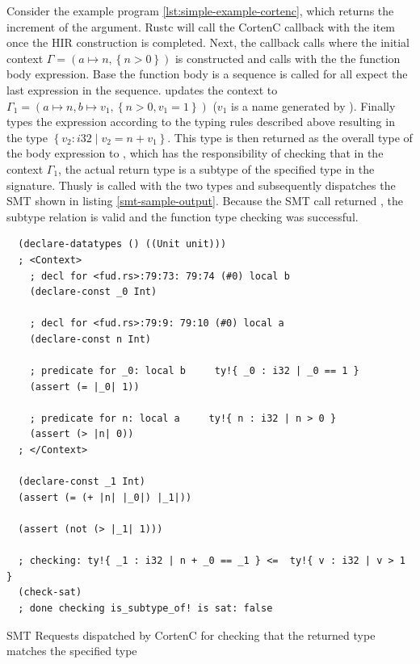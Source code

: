 \documentclass[twoside, english]{sdqthesis}
\theoremstyle{definition}
\begin{document}
Consider the example program \ref{lst:simple-example-cortenc}, which returns the increment of the argument.
Rustc will call the CortenC callback with the item  once the HIR construction is completed. Next, the callback calls  where the initial context $\Gamma = ( a \mapsto n, \left\{ n > 0\right\})$ is constructed and calls  with the the function body expression. Base the function body is a sequence  is called for all expect the last expression in the sequence.  updates the context to $\Gamma_1 = ( a \mapsto n, b \mapsto v_1, \left\{ n > 0, v_1 = 1\right\})$ ($v_1$ is a name generated by ). 
Finally  types the expression  according to the typing rules described above resulting in the type $\left\{ v_2 : i32 \mid v_2 = n + v_1\right\}$.
This type is then returned as the overall type of the body expression to , which has the responsibility of checking that in the context $\Gamma_1$, the actual return type is a subtype of the specified type in the signature. 
Thusly  is called with the two types and subsequently dispatches the SMT shown in listing \ref{smt-sample-output}. 
Because the SMT call returned , the subtype relation is valid and the function type checking was successful.


\begin{listing}[ht]
  \begin{verbatim}
  (declare-datatypes () ((Unit unit)))
  ; <Context>
    ; decl for <fud.rs>:79:73: 79:74 (#0) local b
    (declare-const _0 Int)
    
    ; decl for <fud.rs>:79:9: 79:10 (#0) local a
    (declare-const n Int)
    
    ; predicate for _0: local b     ty!{ _0 : i32 | _0 == 1 }
    (assert (= |_0| 1))
    
    ; predicate for n: local a     ty!{ n : i32 | n > 0 }
    (assert (> |n| 0))
  ; </Context>

  (declare-const _1 Int)
  (assert (= (+ |n| |_0|) |_1|))
  
  (assert (not (> |_1| 1)))
  
  ; checking: ty!{ _1 : i32 | n + _0 == _1 } <=  ty!{ v : i32 | v > 1 }
  (check-sat)
  ; done checking is_subtype_of! is sat: false
  \end{verbatim}
  \caption{SMT Requests dispatched by CortenC for checking that the returned type matches the specified type}
  \label{lst:smt-sample-output}
\end{listing}
\end{document}
